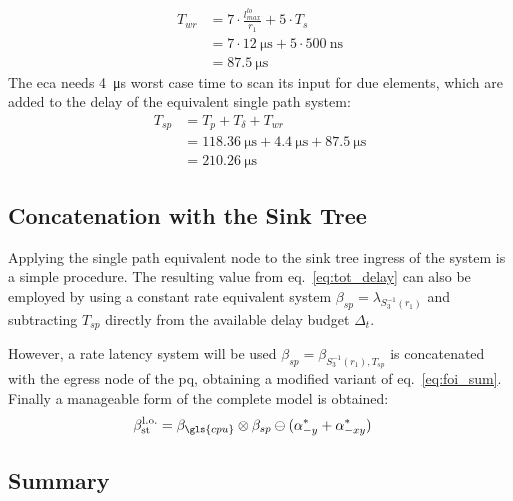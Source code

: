 %
\begin{equation}
\begin{aligned}
T_{wr} &= 7 \cdot \frac{l^{lo}_{max}}{r_1} + 5 \cdot T_s\\
&= 7 \cdot \SI{12}{\micro\second} + 5 \cdot \SI{500}{\nano\second}\\
&= \SI{87.5}{\micro\second}
 \end{aligned}
\end{equation}
%
The \gls{eca} needs \SI{4}{\micro\second} worst case time to scan its input for due elements, which are added to the delay of the equivalent single path system:
%
\begin{equation}
\begin{aligned}
T_{sp} &= T_p + T_\delta + T_{wr}\\
&= \SI{118.36}{\micro\second} + \SI{4.4}{\micro\second} + \SI{87.5}{\micro\second}\\
&= \SI{210.26}{\micro\second}
\label{eq:tot_delay}
 \end{aligned}
\end{equation}
%
\subsection{Concatenation with the Sink Tree}
Applying the single path equivalent node to the sink tree ingress of the system is a simple procedure.
The resulting value from eq.~\ref{eq:tot_delay} can also be employed by using a constant rate equivalent system $\beta_{sp} = \lambda_{S^{-1}_3(r_1)}$ and subtracting $T_{sp}$ directly from the available delay budget $\Delta_t$.
\par
However, a rate latency system will be used $\beta_{sp} = \beta_{S^{-1}_3(r_1), T_{sp}}$ is concatenated with the egress node of the \gls{pq}, obtaining a modified variant of eq.~\ref{eq:foi_sum}.
Finally a manageable form of the complete model is obtained:
%
\begin{equation}
\begin{aligned}
\mathrm{\beta^{l.o.}_{st}} &= \beta_{\gls{cpu}} \otimes \beta_{sp} \ominus (\alpha^*_{-y} + \alpha^{*}_{-xy})
 \end{aligned}
\end{equation}
\fi

\subsection{Summary}


